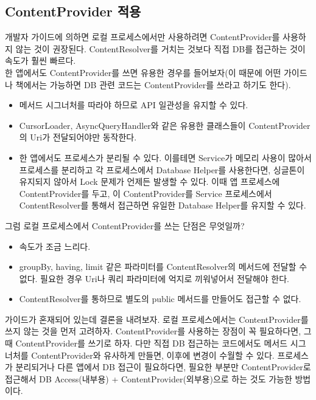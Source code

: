 \subsection{ContentProvider 적용}
개발자 가이드에 의하면 로컬 프로세스에서만 사용하려면 ContentProvider를 사용하지 않는 것이 권장된다. ContentResolver를 거치는 것보다 직접 DB를 접근하는 것이 속도가 훨씬 빠르다.\\

한 앱에서도 ContentProvider를 쓰면 유용한 경우를 들어보자(이 때문에 어떤 가이드나 책에서는 가능하면 DB 관련 코드는 ContentProvider를 쓰라고 하기도 한다).
\begin{itemize}
\item 메서드 시그너처를 따라야 하므로 API 일관성을 유지할 수 있다.
\item CursorLoader, AsyncQueryHandler와 같은 유용한 클래스들이 ContentProvider의 Uri가 전달되어야만 동작한다.
\item 한 앱에서도 프로세스가 분리될 수 있다. 이를테면 Service가 메모리 사용이 많아서 프로세스를 분리하고 각 프로세스에서 Database Helper를 사용한다면, 싱글톤이 유지되지 않아서 Lock 문제가 언제든 발생할 수 있다.
이때 앱 프로세스에 ContentProvider를 두고, 이 ContentProvider를 Service 프로세스에서 ContentResolver를 통해서 접근하면 유일한 Database Helper를 유지할 수 있다. %
\end {itemize}

그럼 로컬 프로세스에서 ContentProvider를 쓰는 단점은 무엇일까?
\begin{itemize}
\item 속도가 조금 느리다.
\item groupBy, having, limit 같은 파라미터를 ContentResolver의 메서드에 전달할 수 없다.  필요한 경우 Uri나 쿼리 파라미터에 억지로 끼워넣어서 전달해야 한다. 
\item ContentResolver를 통하므로 별도의 public 메서드를 만들어도 접근할 수 없다.
\end {itemize}

가이드가 혼재되어 있는데 결론을 내려보자.
로컬 프로세스에서는 ContentProvider를 쓰지 않는 것을 먼저 고려하자. ContentProvider를 사용하는 장점이 꼭 필요하다면, 그때 ContentProvider를 쓰기로 하자.
다만 직접 DB 접근하는 코드에서도 메서드 시그너처를 ContentProvider와 유사하게 만들면, 이후에 변경이 수월할 수 있다.
프로세스가 분리되거나 다른 앱에서 DB 접근이 필요하다면, 필요한 부분만 ContentProvider로 접근해서 DB Access(내부용) + ContentProvider(외부용)으로 하는 것도 가능한 방법이다.\\

